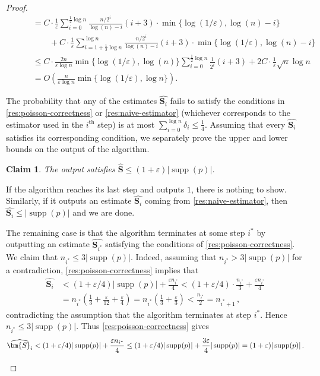 \documentclass[10pt,a4paper]{article}
\newtheorem{claim}{Claim}[section]
\DeclareMathOperator{\supp}{supp}   %
\renewcommand{\epsilon}{\varepsilon}
\begin{document}
\begin{proof}
\begin{align*}
&\qquad= C \cdot \frac{1}{\epsilon}\sum_{i=0}^{\tfrac{1}{2} \log n} \frac{n/2^i}{\log(n)-i}
    (i + 3) \cdot \min\{ \log(1/\epsilon),
\log(n) - i \} \\
&\qquad\qquad+ C \cdot \frac{1}{\epsilon}\sum_{i=1+\tfrac{1}{2}\log n}^{\log n}
    \frac{n/2^i}{\log(n)-i} (i + 3) \cdot \min\{ \log(1/\epsilon),
\log(n) - i \} \\
&\qquad\leq C \cdot \frac{2n}{\epsilon \log n} \min\{\log(1/\epsilon), \log(n)\} \sum_{i=0}^{\tfrac{1}{2}
\log n} \frac{1}{2^i} (i + 3) + 2C \cdot \frac{1}{\epsilon}\sqrt n \log n \\
&\qquad= O\left( \frac{n}{\epsilon \log n} \min\{ \log(1/\epsilon), \log n \} \right).
\end{align*}

The probability that any of the estimates $\widehat{\bm{S}_i}$ fails to satisfy the conditions in
\cref{res:poisson-correctness} or \cref{res:naive-estimator} (whichever corresponds to the estimator
used in the $i^{\text{th}}$ step) is at most $\sum_{i=0}^{\log n} \delta_i \leq \frac{1}{4}$.
Assuming that every $\widehat{\bm{S}_i}$ satisfies its corresponding condition, we separately prove
the upper and lower bounds on the output of the algorithm.

\begin{claim}
    The output satisfies $\widehat{\bm{S}} \le (1+\epsilon)|\supp(p)|$.
\end{claim}
\begin{subproof}
    If the algorithm reaches its last step and outputs $1$, there is nothing to show. Similarly, if
    it outputs an estimate $\widehat{\bm{S}_i}$ coming from \cref{res:naive-estimator}, then
    $\widehat{\bm{S}_i} \le |\supp(p)|$ and we are done.

    The remaining case is that the algorithm terminates at some step $i^*$ by outputting an estimate
    $\widehat{\bm{S}_{i^*}}$ satisfying the conditions of \cref{res:poisson-correctness}. We claim
    that $n_{i^*} \le 3|\supp(p)|$. Indeed, assuming that $n_{i^*} > 3|\supp(p)|$ for a
    contradiction, \cref{res:poisson-correctness} implies that
    \begin{align*}
        \widehat{\bm{S}_i}
        &< (1 + \epsilon/4)|\supp(p)| + \frac{\epsilon n_{i^*}}{4}
        < (1 + \epsilon/4) \cdot \frac{n_{i^*}}{3} + \frac{\epsilon n_{i^*}}{4} \\
        &= n_{i^*} \left(\frac{1}{3} + \frac{\epsilon}{12} + \frac{\epsilon}{4}\right)
        = n_{i^*} \left(\frac{1}{3} + \frac{\epsilon}{3}\right)
        < \frac{n_{i^*}}{2}
        = n_{i^*+1} \,,
    \end{align*}
    contradicting the assumption that the algorithm terminates at step $i^*$. Hence $n_{i^*} \le
    3|\supp(p)|$. Thus \cref{res:poisson-correctness} gives
    \[
        \widehat{\bm{S}_i} < (1 + \epsilon/4)|\supp(p)| + \frac{\epsilon n_{i^*}}{4}
        \le (1 + \epsilon/4)|\supp(p)| + \frac{3\epsilon}{4} |\supp(p)|
        = (1 + \epsilon) |\supp(p)| \,.
        \qedhere
    \]
\end{subproof}


\end{proof}
\end{document}
